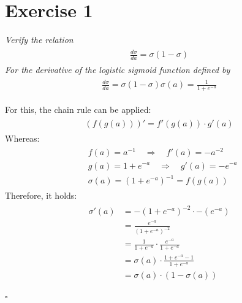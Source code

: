 \documentclass[11pt]{scrartcl} %
\begin{document}
         \vspace{5mm}
\section*{Exercise 1}
         {\it Verify the relation}
         \begin{align*}
           \begin{aligned}
             \frac{d\sigma}{da} = \sigma (1-\sigma)
           \end{aligned}
         \end{align*}
             {\it For the derivative of the logistic sigmoid function defined by}
             \begin{align*}
               \begin{aligned}
                 \frac{d\sigma}{da} = \sigma (1-\sigma)
                 \sigma(a) = \frac{1}{1+ e^{-a}}
               \end{aligned}
             \end{align*}
             
             For this, the chain rule can be applied:
             \begin{align*}
               \begin{aligned}
                 (f(g(a)))' = f'(g(a))\cdot g'(a)
               \end{aligned}
             \end{align*}
             Whereas:
             \begin{align*}
               \begin{aligned}
                 & f(a) = a^{-1} \quad \Longrightarrow \quad f'(a) = -a^{-2}\\
                 & g(a) = 1+e^{-a} \quad \Longrightarrow \quad g'(a) = -e^{-a}\\
                 & \sigma(a) = (1+e^{-a})^{-1} = f(g(a))
               \end{aligned}
             \end{align*}
             Therefore, it holds:
             \begin{align*}
               \begin{aligned}
                 \sigma'(a) &= -(1+e^{-a})^{-2} \cdot -(e^{-a})\\
                 & = \frac{e^{-a}}{(1+e^{-a})^{-2}}\\
                 & = \frac{1}{1+e^{-a}} \cdot \frac{e^{-a}}{1+e^{-a}}\\
                 & = \sigma(a) \cdot \frac{1+e^{-a}-1}{1+e^{-a}}\\
                 & = \sigma(a) \cdot (1 - \sigma(a))\\
               \end{aligned}
             \end{align*}
             \begin{flushright}
               $\square$\\
             \end{flushright}
\end{document}
